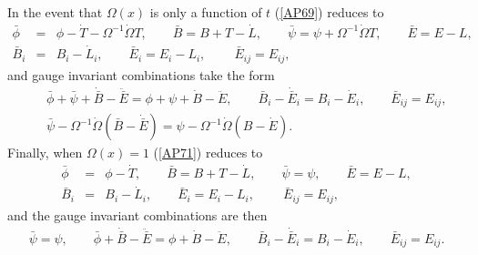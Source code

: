 \documentclass[aps]{revtex4}
\begin{document}
In the event that $\Omega(x)$ is only a function of $t$ (\ref{AP69}) reduces to 
\begin{eqnarray}
\bar{\phi}&=&\phi-\dot{T}-\Omega^{-1}\dot{\Omega}T,\qquad \bar{B}=B+T-\dot{L},\qquad \bar{\psi}=\psi+\Omega^{-1}\dot{\Omega}T,\qquad \bar{E}=E-L,
\nonumber\\
\bar{B}_i&=&B_i-\dot{L}_i,\qquad \bar{E}_i=E_i-L_i,\ \qquad \bar{E}_{ij}=E_{ij},
\label{AP71}
\end{eqnarray}
%
and gauge invariant combinations  take the form
\begin{eqnarray}
&&\bar{\phi}+\bar{\psi}+\dot{\bar{B}}-\ddot{\bar{E}}=\phi+\psi+\dot{B}-\ddot{E},\qquad \bar{B}_i-\dot{\bar{E}}_i=B_i-\dot{E}_i,\qquad \bar{E}_{ij}=E_{ij},
\nonumber\\
&&\bar{\psi}-\Omega^{-1}\dot{\Omega}(\bar{B}-\dot{\bar{E}})=\psi-\Omega^{-1}\dot{\Omega}(B-\dot{E}).
\label{AP72}
\end{eqnarray}
%
Finally, when $\Omega(x)=1$ (\ref{AP71}) reduces to 
%
\begin{eqnarray}
\bar{\phi}&=&\phi-\dot{T},\qquad \bar{B}=B+T-\dot{L},\qquad \bar{\psi}=\psi ,\qquad \bar{E}=E-L,
\nonumber\\
\bar{B}_i&=&B_i-\dot{L}_i,\qquad \bar{E}_i=E_i-L_i,\ \qquad \bar{E}_{ij}=E_{ij},
\label{AP73}
\end{eqnarray}
%
and the gauge invariant combinations are then 
\begin{eqnarray}
\bar{\psi}=\psi,\qquad \bar{\phi}+\dot{\bar{B}}-\ddot{\bar{E}}=\phi+\dot{B}-\ddot{E},\qquad \bar{B}_i-\dot{\bar{E}}_i=B_i-\dot{E}_i,\qquad \bar{E}_{ij}=E_{ij}.
\label{AP74}
\end{eqnarray}
%
\end{document}
